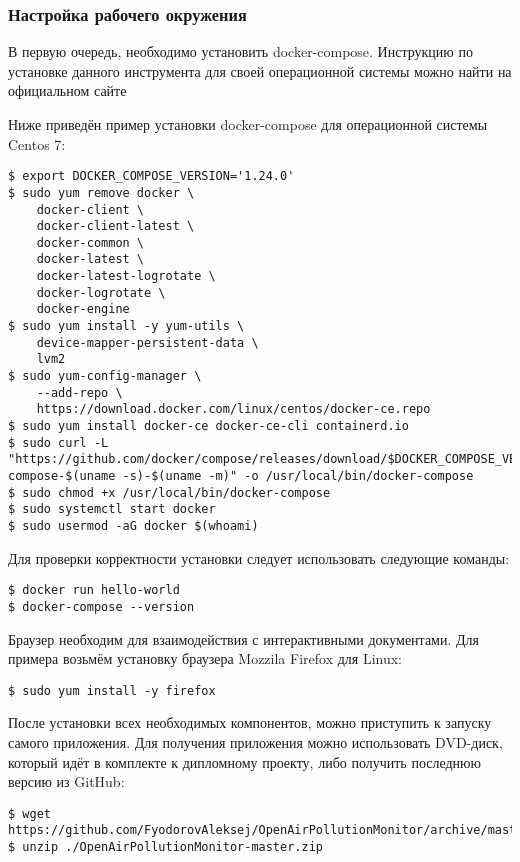 \subsubsection{Настройка рабочего окружения}

В первую очередь, необходимо установить docker-compose.
Инструкцию по установке данного инструмента для своей операционной системы можно найти на официальном сайте ~\cite{docker_compose_install_site}

Ниже приведён пример установки docker-compose для операционной системы Centos 7:

\begin{lstlisting}
$ export DOCKER_COMPOSE_VERSION='1.24.0'
$ sudo yum remove docker \
    docker-client \
    docker-client-latest \
    docker-common \
    docker-latest \
    docker-latest-logrotate \
    docker-logrotate \
    docker-engine
$ sudo yum install -y yum-utils \
    device-mapper-persistent-data \
    lvm2
$ sudo yum-config-manager \
    --add-repo \
    https://download.docker.com/linux/centos/docker-ce.repo
$ sudo yum install docker-ce docker-ce-cli containerd.io
$ sudo curl -L "https://github.com/docker/compose/releases/download/$DOCKER_COMPOSE_VERSION/docker-compose-$(uname -s)-$(uname -m)" -o /usr/local/bin/docker-compose
$ sudo chmod +x /usr/local/bin/docker-compose
$ sudo systemctl start docker
$ sudo usermod -aG docker $(whoami)
\end{lstlisting}

Для проверки корректности установки следует использовать следующие команды:

\begin{lstlisting}
$ docker run hello-world
$ docker-compose --version
\end{lstlisting}

Браузер необходим для взаимодействия с интерактивными документами.
Для примера возьмём установку браузера Mozzila Firefox для Linux:

\begin{lstlisting}
$ sudo yum install -y firefox    
\end{lstlisting}


После установки всех необходимых компонентов, можно приступить к запуску самого приложения.
Для получения приложения можно использовать DVD-диск, который идёт в комплекте к дипломному проекту, либо получить последнюю версию из GitHub:

\begin{lstlisting}
$ wget https://github.com/FyodorovAleksej/OpenAirPollutionMonitor/archive/master.zip
$ unzip ./OpenAirPollutionMonitor-master.zip
\end{lstlisting}


